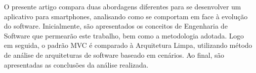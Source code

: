 O presente artigo compara duas abordagens diferentes para se desenvolver um aplicativo para smartphones, analisando como se comportam em face à evolução do software.
Inicialmente, são apresentados os conceitos de Engenharia de Software que permearão este trabalho, bem como a metodologia adotada.
Logo em seguida, o padrão MVC é comparado à Arquitetura Limpa, utilizando método de análise de arquiteturas de software baseado em cenários.
Ao final, são apresentadas as conclusões da análise realizada.